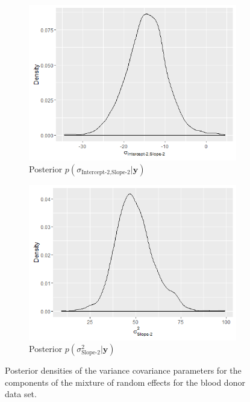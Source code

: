 \begin{figure}[!htb]
\begin{subfigure}[b]{0.4\textwidth}
		\includegraphics[width=\textwidth]{mainmatter/chapter_6_blood_donor/G12_2.png}	
          \caption{\label{fig : cov_blood_donor_12_2}Posterior $p(\sigma_{\text{Intercept-2}, \text{Slope-2}} | \boldsymbol{y})$}
	\end{subfigure}
	\begin{subfigure}[b]{0.4\textwidth}
		\includegraphics[width=\textwidth]{mainmatter/chapter_6_blood_donor/G22_2.png}	
          \caption{\label{fig : cov_blood_donor_22_2}Posterior $p(\sigma^2_\text{Slope-2}| \boldsymbol{y})$}
	\end{subfigure}	

	\caption{Posterior densities of the variance covariance parameters for the components of the mixture of random effects for the blood donor data set.}
	\label{fig : cov_blood_donor}    
\end{figure} 